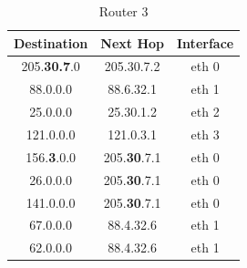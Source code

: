 \documentclass{WeSTassignment}
\begin{document}
\begin{table}[h]
\centering
\caption{Router 3}
\label{Router 3}
\begin{tabular}{ccc}
\hline
\multicolumn{1}{|c|}{\textbf{Destination}} & \multicolumn{1}{c|}{\textbf{Next Hop}} & \multicolumn{1}{c|}{\textbf{Interface}} \\ \hline
205.\textbf{30.7}.0                                  & 205.30.7.2                             & eth 0                                   \\
88.0.0.0                                   & 88.6.32.1                              & eth 1                                   \\
25.0.0.0                                   & 25.30.1.2                              & eth 2                                   \\
121.0.0.0                                  & 121.0.3.1                              & eth 3                                   \\
156.\textbf{3}.0.0                                  & 205.\textbf{30}.7.1                             & eth 0                                   \\
26.0.0.0                                   & 205.\textbf{30}.7.1                             & eth 0                                   \\
141.0.0.0                                  & 205.\textbf{30}.7.1                             & eth 0                                   \\
67.0.0.0                                   & 88.4.32.6                              & eth 1                                   \\
62.0.0.0                                   & 88.4.32.6                              & eth 1                                  
\end{tabular}
\end{table}


\end{document}
